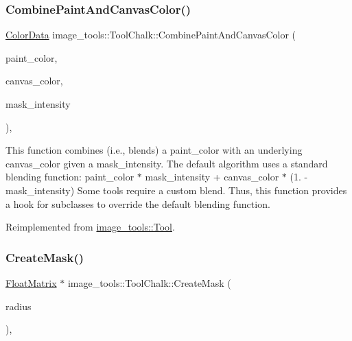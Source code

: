\subsubsection{\texorpdfstring{Combine\+Paint\+And\+Canvas\+Color()}{CombinePaintAndCanvasColor()}}
{\footnotesize\ttfamily \hyperlink{classimage__tools_1_1ColorData}{Color\+Data} image\+\_\+tools\+::\+Tool\+Chalk\+::\+Combine\+Paint\+And\+Canvas\+Color (\begin{DoxyParamCaption}\item[{const \hyperlink{classimage__tools_1_1ColorData}{Color\+Data} \&}]{paint\+\_\+color,  }\item[{const \hyperlink{classimage__tools_1_1ColorData}{Color\+Data} \&}]{canvas\+\_\+color,  }\item[{float}]{mask\+\_\+intensity }\end{DoxyParamCaption})\hspace{0.3cm}{\ttfamily [override]}, {\ttfamily [virtual]}}

This function combines (i.\+e., blends) a paint\+\_\+color with an underlying canvas\+\_\+color given a mask\+\_\+intensity. The default algorithm uses a standard blending function\+: paint\+\_\+color $\ast$ mask\+\_\+intensity + canvas\+\_\+color $\ast$ (1. -\/ mask\+\_\+intensity) Some tools require a custom blend. Thus, this function provides a hook for subclasses to override the default blending function. 

Reimplemented from \hyperlink{classimage__tools_1_1Tool_a1f4f417dd13da9ff60481e3e1ff30b69}{image\+\_\+tools\+::\+Tool}.

\mbox{\label{classimage__tools_1_1ToolChalk_ac5b2bd1d685a80ae4b296defcbc80580}} 
\subsubsection{\texorpdfstring{Create\+Mask()}{CreateMask()}}
{\footnotesize\ttfamily \hyperlink{classimage__tools_1_1FloatMatrix}{Float\+Matrix} $\ast$ image\+\_\+tools\+::\+Tool\+Chalk\+::\+Create\+Mask (\begin{DoxyParamCaption}\item[{float}]{radius }\end{DoxyParamCaption})\hspace{0.3cm}{\ttfamily [override]}, {\ttfamily [virtual]}}

